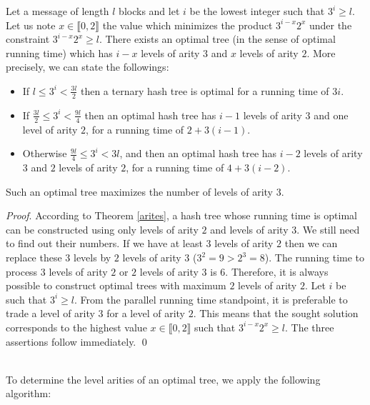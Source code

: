 \documentclass{llncs}
\renewenvironment{proof}{\paragraph{Proof} }{\hfill\qed}
\renewcommand{\paragraph}[1]{\noindent\textit{#1}.}
\begin{document}
\begin{theorem}\label{min_running_time_3_cases}
Let a message of length $l$ blocks and let $i$ be the lowest integer such that $3^i \geq l$. Let us note $x \in \llbracket 0,2 \rrbracket$ the value which minimizes
the product $3^{i-x}2^x$ under the constraint $3^{i-x}2^x \geq l$.  There exists an optimal tree (in the sense of optimal running time) which has $i-x$ levels 
of arity $3$ and $x$ levels of arity $2$. More precisely, we can state the followings:
\begin{itemize}
 \item If $l \leq 3^i < \frac{3l}{2}$ then a ternary hash tree is optimal for a running time of $3i$.
 \item If $\frac{3l}{2} \leq 3^i < \frac{9l}{4}$ then an optimal hash tree has $i-1$ levels of arity $3$ and one level of arity $2$,
for a running time of $2+3(i-1)$.
 \item Otherwise $\frac{9l}{4} \leq 3^i < 3l$, and then an optimal hash tree has $i-2$ levels of arity $3$ and $2$ levels of
arity $2$, for a running time of $4+3(i-2)$.
\end{itemize}
Such an optimal tree maximizes the number of levels of arity $3$.
\end{theorem}

\begin{proof}
According to Theorem \ref{arites}, a hash tree whose running time is optimal can be constructed using only levels of arity $2$ and levels of arity $3$.
We still need to find out their numbers.
If we have at least $3$ levels of arity $2$ then we can replace these $3$ levels by $2$ levels of arity $3$ ($3^2=9>2^3=8$).
The running time to process $3$ levels of arity $2$ or $2$ levels of arity $3$ is $6$. 
Therefore, it is always possible to construct optimal trees with maximum $2$ levels of arity $2$. 
Let $i$ be such that $3^i \geq l$.
From the parallel running time standpoint, it is preferable to trade a level of arity $3$ for a level of arity $2$.
This means that the sought solution corresponds to the highest value $x \in \llbracket 0,2 \rrbracket$ 
 such that $3^{i-x}2^x\geq l$. The three assertions follow immediately.
\end{proof}



~\\
To determine the level arities of an optimal tree, we apply the following algorithm:~\\
\end{document}
